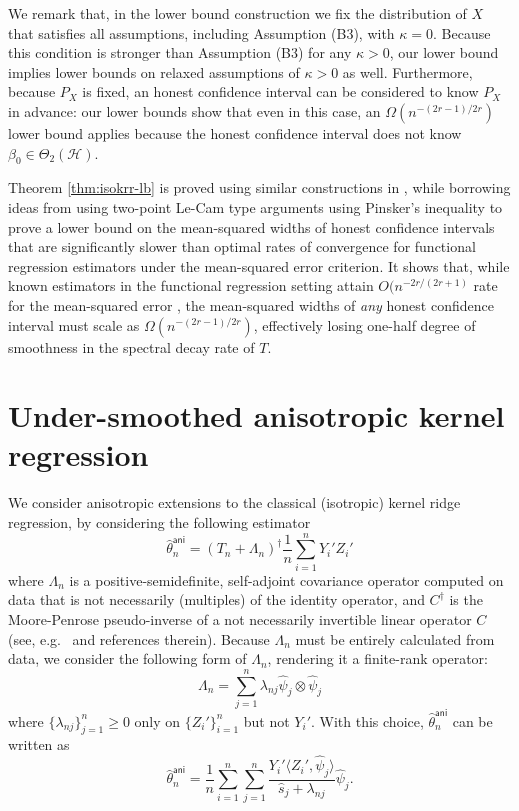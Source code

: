\documentclass[11pt,a4paper]{article}
\renewcommand{\hat}{\widehat}
\theoremstyle{definition}
\theoremstyle{plain}
\theoremstyle{remark}
\newcommand{\mH}{\mathcal H}
\newcommand{\ani}{\mathsf{ani}}
\begin{document}
We remark that, in the lower bound construction we fix the distribution of $X$ that satisfies all assumptions, including Assumption (B3), with $\kappa=0$.
Because this condition is stronger than Assumption (B3) for any $\kappa>0$, our lower bound implies lower bounds on relaxed assumptions of $\kappa>0$ as well.
Furthermore, because $P_X$ is fixed, an honest confidence interval can be considered to know $P_X$ in advance: our lower bounds show that even in this case,
an $\Omega(n^{-(2r-1)/2r})$ lower bound applies because the honest confidence interval does not know $\beta_0\in\Theta_2(\mH)$.

Theorem \ref{thm:isokrr-lb} is proved using similar constructions in \citep{cai2012minimax}, while borrowing ideas from \citep{cai2006adaptive} 
using two-point Le-Cam type arguments using Pinsker's inequality to prove a lower bound on the mean-squared widths of honest confidence intervals
that are significantly slower than optimal rates of convergence for functional regression estimators under the mean-squared error criterion.
It shows that, while known estimators in the functional regression setting attain $O(n^{-2r/(2r+1)}$ rate for the mean-squared error \citep{cai2012minimax},
the mean-squared widths of \emph{any} honest confidence interval must scale as $\Omega(n^{-(2r-1)/2r})$, effectively losing one-half degree of smoothness in the spectral decay rate of $T$.

\section{Under-smoothed anisotropic kernel regression}

We consider anisotropic extensions to the classical (isotropic) kernel ridge regression, by considering the following estimator
$$
\hat\theta_n^\ani = (T_n+\Lambda_n)^{\dagger}\frac{1}{n}\sum_{i=1}^n Y_i' Z_i'
$$
where $\Lambda_n$ is a positive-semidefinite, self-adjoint covariance operator computed on data that is not necessarily (multiples) of the identity operator,
and $C^\dagger$ is the Moore-Penrose pseudo-inverse of a not necessarily invertible linear operator $C$ (see, e.g.~\citep{fongi2023moore} and references therein).
Because $\Lambda_n$ must be entirely calculated from data, we consider the following form of $\Lambda_n$, rendering it a finite-rank operator:
$$
\Lambda_n = \sum_{j=1}^n \lambda_{nj}\hat\psi_j\otimes\hat\psi_j
$$
where $\{\lambda_{nj}\}_{j=1}^n\geq 0$ only on $\{Z_i'\}_{i=1}^n$ but not $Y_i'$.
With this choice, $\hat\theta_n^\ani$ can be written as
$$
\hat\theta_n^\ani = \frac{1}{n}\sum_{i=1}^n\sum_{j=1}^n \frac{Y_i'\langle Z_i',\hat\psi_j\rangle}{\hat s_j+\lambda_{nj}}\hat\psi_j.
$$
\end{document}
